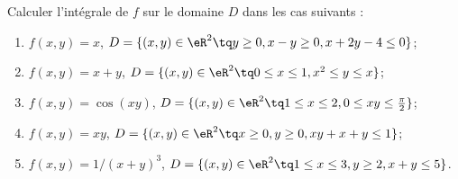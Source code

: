 
\begin{exercice}\label{exoOutilsMath-0102}

    Calculer l'intégrale de $f$ sur le domaine $D$ dans les cas suivants :
    \begin{enumerate}
        \item
            $f(x,y)=x$, $D=\{ (x,y)\in\eR^2\tq y\geq 0,x-y\geq 0,x+2y-4\leq 0 \}$;
        \item
            $f(x,y)=x+y$, $D=\{ (x,y)\in\eR^2\tq 0\leq x\leq 1,x^2\leq y\leq x\}$;
        \item
            $f(x,y)=\cos(xy)$, $D=\{ (x,y)\in\eR^2\tq 1 \leq x\leq 2,0\leq xy\leq \frac{ \pi }{2}\}$;
        \item
            $f(x,y)=xy$, $D=\{ (x,y)\in\eR^2\tq x\geq 0,y\geq 0,xy+x+y\leq 1\}$;
        \item
            $f(x,y)=1/(x+y)^3$, $D=\{ (x,y)\in\eR^2\tq 1\leq x\leq 3,y\geq 2,x+y\leq 5\}$.
    \end{enumerate}

\end{exercice}
